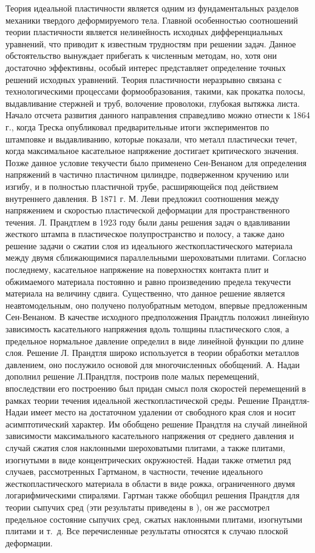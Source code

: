
{\actuality} Теория идеальной пластичности является одним из фундаментальных разделов механики твердого деформируемого тела.
Главной особенностью соотношений теории пластичности является нелинейность исходных дифференциальных уравнений, что приводит к известным трудностям при решении задач. Данное обстоятельство вынуждает прибегать к численным методам, но, хотя они достаточно эффективны, особый интерес представляет определение точных решений исходных уравнений.
Теория пластичности неразрывно связана с технологическими процессами формообразования, такими, как прокатка полосы, выдавливание стержней и труб, волочение проволоки, глубокая вытяжка листа.
Начало отсчета развития данного направления справедливо можно отнести к 1864 г., когда Треска опубликовал предварительные итоги экспериментов по штамповке и выдавливанию, которые показали, что металл пластически течет, когда максимальное касательное напряжение достигает критического значения. Позже данное условие текучести было применено Сен-Венаном \autocite{Todhunter:1893} для определения напряжений в частично пластичном цилиндре, подверженном кручению или изгибу, и в полностью пластичной трубе, расширяющейся под действием внутреннего давления. В 1871 г. М. Леви \autocite{Levi:1871} предложил соотношения между напряжением и скоростью пластической деформации для пространственного течения. Л. Прандтлем \autocite{Prandtl:1948} в 1923 году были даны решения задач о вдавливании жесткого штампа в пластическое полупространство и полосу, а также дано решение задачи о сжатии слоя из идеального жесткопластического материала между двумя сближающимися параллельными шероховатыми плитами. Согласно последнему, касательное напряжение на поверхностях контакта плит и обжимаемого материала постоянно и равно произведению предела текучести материала на величину сдвига. Существенно, что данное решение является неавтомодельным, оно получено полуобратным методом, впервые предложенным Сен-Венаном. В качестве исходного предположения Прандтль положил линейную зависимость касательного напряжения вдоль толщины пластического слоя, а предельное нормальное давление определил в виде линейной функции по длине слоя. Решение Л. Прандтля широко используется в теории обработки металлов давлением, оно послужило основой для многочисленных обобщений.
А. Надаи \autocite{Nadai:1954} дополнил решение Л.Прандтля, построив поле малых перемещений, впоследствии его построению был придан смысл поля скоростей перемещений в рамках теории течения идеальной жесткопластической среды. Решение Прандтля-Надаи имеет место на достаточном удалении от свободного края слоя и носит асимптотический характер. Им обобщено решение Прандтля на случай линейной зависимости максимального касательного напряжения от среднего давления и случай сжатия слоя наклонными шероховатыми плитами, а также плитами, изогнутыми в виде концентрических окружностей. Надаи также отметил ряд случаев, рассмотренных Гартманом, в частности, течение идеального жесткопластического материала в области в виде рожка, ограниченного двумя логарифмическими спиралями. Гартман также обобщил решения Прандтля для теории сыпучих сред (эти результаты приведены в \autocite{Nadai:1969}), он же рассмотрел предельное состояние сыпучих сред, сжатых наклонными плитами, изогнутыми плитами и т.~д. Все перечисленные результаты относятся к случаю плоской деформации.
